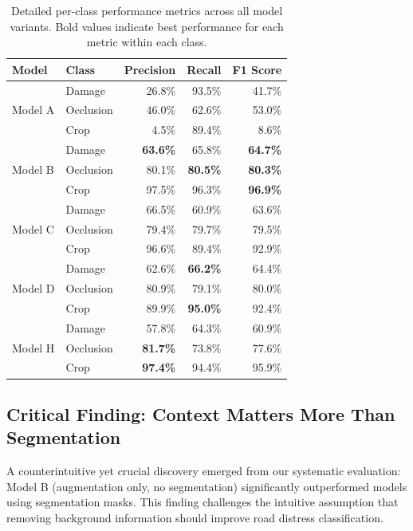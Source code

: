 \documentclass[12pt]{article}
\begin{document}
\begin{table}[!h]
\centering
\small
\begin{tabular}{llrrr}
\toprule
\textbf{Model} & \textbf{Class} & \textbf{Precision} & \textbf{Recall} & \textbf{F1 Score} \\
\midrule
\multirow{3}{*}{Model A} & Damage & 26.8\% & 93.5\% & 41.7\% \\
 & Occlusion & 46.0\% & 62.6\% & 53.0\% \\
 & Crop & 4.5\% & 89.4\% & 8.6\% \\
\midrule
\multirow{3}{*}{Model B} & Damage & \textbf{63.6\%} & 65.8\% & \textbf{64.7\%} \\
 & Occlusion & 80.1\% & \textbf{80.5\%} & \textbf{80.3\%} \\
 & Crop & 97.5\% & 96.3\% & \textbf{96.9\%} \\
\midrule
\multirow{3}{*}{Model C} & Damage & 66.5\% & 60.9\% & 63.6\% \\
 & Occlusion & 79.4\% & 79.7\% & 79.5\% \\
 & Crop & 96.6\% & 89.4\% & 92.9\% \\
\midrule
\multirow{3}{*}{Model D} & Damage & 62.6\% & \textbf{66.2\%} & 64.4\% \\
 & Occlusion & 80.9\% & 79.1\% & 80.0\% \\
 & Crop & 89.9\% & \textbf{95.0\%} & 92.4\% \\
\midrule
\multirow{3}{*}{Model H} & Damage & 57.8\% & 64.3\% & 60.9\% \\
 & Occlusion & \textbf{81.7\%} & 73.8\% & 77.6\% \\
 & Crop & \textbf{97.4\%} & 94.4\% & 95.9\% \\
\bottomrule
\end{tabular}
\caption{Detailed per-class performance metrics across all model variants. Bold values indicate best performance for each metric within each class.}
\end{table}

\subsection{Critical Finding: Context Matters More Than Segmentation}

A counterintuitive yet crucial discovery emerged from our systematic evaluation: Model B (augmentation only, no segmentation) significantly outperformed models using segmentation masks. This finding challenges the intuitive assumption that removing background information should improve road distress classification.
\end{document}
